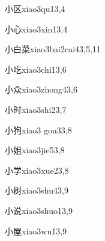 \begin{verbete}{小区}{xiao3qu1}{3,4}
\end{verbete}

\begin{verbete}{小心}{xiao3xin1}{3,4}
\end{verbete}

\begin{verbete}{小白菜}{xiao3bai2cai4}{3,5,11}
\end{verbete}

\begin{verbete}{小吃}{xiao3chi1}{3,6}
\end{verbete}

\begin{verbete}{小众}{xiao3zhong4}{3,6}
\end{verbete}

\begin{verbete}{小时}{xiao3shi2}{3,7}
\end{verbete}

\begin{verbete}{小狗}{xiao3 gou3}{3,8}
\end{verbete}

\begin{verbete}{小姐}{xiao3jie5}{3,8}
\end{verbete}

\begin{verbete}{小学}{xiao3xue2}{3,8}
\end{verbete}

\begin{verbete}{小树}{xiao3shu4}{3,9}
\end{verbete}

\begin{verbete}{小说}{xiao3shuo1}{3,9}
\end{verbete}

\begin{verbete}{小屋}{xiao3wu1}{3,9}
\end{verbete}

